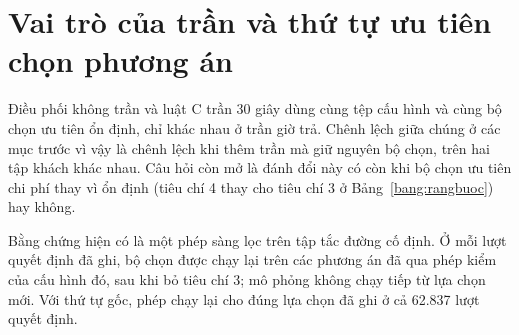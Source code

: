 
\section{Vai trò của trần và thứ tự ưu tiên chọn phương án}
\label{muc:c4-vaitro}

Điều phối không trần và luật C trần 30 giây dùng cùng tệp cấu hình và cùng bộ chọn ưu tiên ổn định, chỉ khác nhau
ở trần giờ trả. Chênh lệch giữa chúng ở các mục trước vì vậy là chênh lệch khi thêm trần mà giữ nguyên bộ chọn, trên
hai tập khách khác nhau. Câu hỏi còn mở là đánh đổi này có còn khi bộ chọn ưu tiên chi phí thay vì ổn định (tiêu chí
4 thay cho tiêu chí 3 ở Bảng~\ref{bang:rangbuoc}) hay không.

Bằng chứng hiện có là một phép sàng lọc trên tập tắc đường cố định. Ở mỗi lượt quyết định đã ghi, bộ chọn được chạy
lại trên các phương án đã qua phép kiểm của cấu hình đó, sau khi bỏ tiêu chí 3; mô phỏng không chạy tiếp từ lựa chọn
mới. Với thứ tự gốc, phép chạy lại cho đúng lựa chọn đã ghi ở cả 62.837 lượt quyết định.

